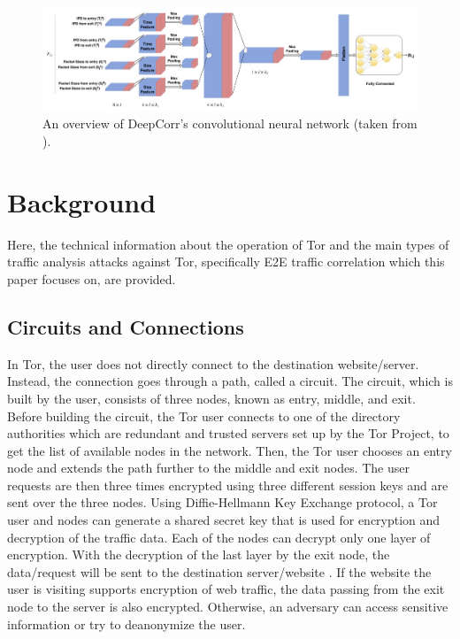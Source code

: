 \documentclass[sigconf]{acmart}
\begin{document}
\begin{figure}[h!]
  \centering
  \includegraphics[width=15cm]{Figure_2.jpeg}
  \caption{\textmd{An overview of DeepCorr's convolutional neural network (taken from \cite{nasr2018deepcorr}).}}
  \label{fig:2} 
\end{figure}

\vspace{-6mm}

\section{Background} \label{2}

Here, the technical information about the operation of Tor and the main types of traffic analysis attacks against Tor, specifically E2E traffic correlation which this paper focuses on, are provided. 


\subsection{Circuits and Connections} \label{2.1}

In Tor, the user does not directly connect to the destination website/server. Instead, the connection goes through a path, called a circuit. The circuit, which is built by the user, consists of three nodes, known as entry, middle, and exit. Before building the circuit, the Tor user connects to one of the directory authorities which are redundant and trusted servers set up by the Tor Project, to get the list of available nodes in the network. Then, the Tor user chooses an entry node and extends the path further to the middle and exit nodes. The user requests are then three times encrypted using three different session keys and are sent over the three nodes. Using Diffie-Hellmann Key Exchange protocol, a Tor user and nodes can generate a shared secret key that is used for encryption and decryption of the traffic data. Each of the nodes can decrypt only one layer of encryption. With the decryption of the last layer by the exit node, the data/request will be sent to the destination server/website \cite{Torprojectoverview}. If the website the user is visiting supports encryption of web traffic, the data passing from the exit node to the server is also encrypted. Otherwise, an adversary can access sensitive information or try to deanonymize the user. 
\end{document}
